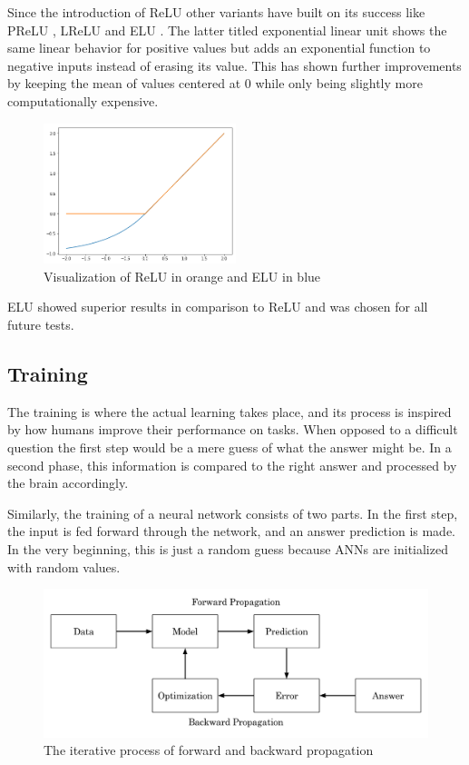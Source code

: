 Since the introduction of ReLU other variants have built on its success like PReLU \cite{He2015a}, LReLU and ELU \cite{Clevert2015}. The latter titled exponential linear unit shows the same linear behavior for positive values but adds an exponential function to negative inputs instead of erasing its value.  This has shown further improvements by keeping the mean of values centered at 0 while only being slightly more computationally expensive.

\begin{figure}[H]
\centering
\par
\includegraphics[width=0.5\textwidth]{imgs/elu_relu1.png}
\caption{Visualization of ReLU in orange and ELU in blue}
\par
\end{figure}

ELU showed superior results in comparison to ReLU and was chosen for all future tests.

\subsection{Training}

The training is where the actual learning takes place, and its process is inspired by how humans improve their performance on tasks. When opposed to a difficult question the first step would be a mere guess of what the answer might be. In a second phase, this information is compared to the right answer and processed by the brain accordingly.

Similarly, the training of a neural network consists of two parts. In the first step, the input is fed forward through the network, and an answer prediction is made. In the very beginning, this is just a random guess because ANNs are initialized with random values. 

\begin{figure}[H]
\centering
\par
\includegraphics[width=1.0\textwidth]{imgs/forward_backward_prop.png}
\caption{The iterative process of forward and backward propagation}
\par
\end{figure}

